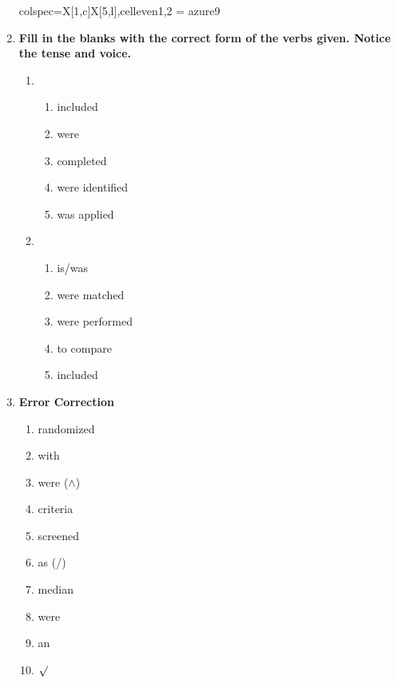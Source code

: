 \documentclass{ctexbook}
\begin{document}
\begin{enumerate}
{\begin{tblr}{colspec={X[1,c]X[5,l]},cell{even}{1,2} = {azure9}}
    \bottomrule
  \end{tblr}
  }

  \item \textbf{Fill in the blanks with the correct form of the verbs given. Notice the tense and voice.}
  \begin{enumerate}
    \item ~
    \begin{enumerate}
      \item included
      \item were
      \item completed
      \item were identified
      \item was applied
    \end{enumerate}
    
    \item ~
    \begin{enumerate}
      \item is/was
      \item were matched
      \item were performed
      \item to compare
      \item included
    \end{enumerate}
  \end{enumerate}

  \item \textbf{Error Correction}
  \begin{enumerate}
    \item randomized
    \item with
    \item were ($\wedge$)
    \item criteria
    \item screened
    \item as (/)
    \item median
    \item were
    \item an
    \item $\surd$
  \end{enumerate}
\end{enumerate}
\end{document}
